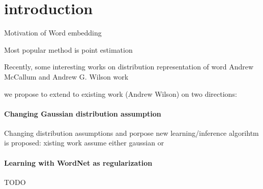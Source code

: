 \section{introduction}
Motivation of Word embedding 

Most popular method is point estimation

Recently, some interesting works on distribution representation of word
Andrew McCallum \cite{vilnis2014word} and
Andrew G. Wilson \cite{athiwaratkun2017multimodal} work

we propose to extend to existing work (Andrew Wilson) on two directions:

\paragraph{Changing Gaussian distribution assumption}
Changing distribution assumptions and porpose new learning/inference algorihtm is proposed:
xisting work assume either gaussian or  

\paragraph{Learning with WordNet as regularization}
TODO
